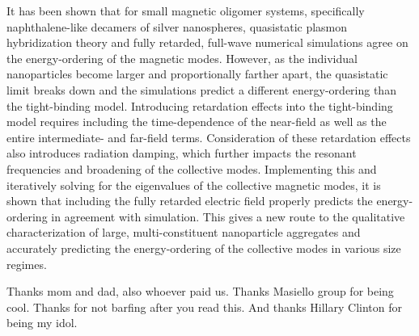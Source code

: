 \documentclass[journal=jpccck,manuscript=article]{achemso}
\begin{document}
It has been shown that for small magnetic oligomer systems, specifically naphthalene-like decamers of silver nanospheres, quasistatic plasmon hybridization theory and fully retarded, full-wave numerical simulations agree on the energy-ordering of the magnetic modes. However, as the individual nanoparticles become larger and proportionally farther apart, the quasistatic limit breaks down and the simulations predict a different energy-ordering than the tight-binding model. Introducing retardation effects into the tight-binding model requires including the time-dependence of the near-field as well as the entire intermediate- and far-field terms. Consideration of these retardation effects also introduces radiation damping, which further impacts the resonant frequencies and broadening of the collective modes. Implementing this and iteratively solving for the eigenvalues of the collective magnetic modes, it is shown that including the fully retarded electric field properly predicts the energy-ordering in agreement with simulation. This gives a new route to the qualitative characterization of large, multi-constituent nanoparticle aggregates and accurately predicting the energy-ordering of the collective modes in various size regimes.

\begin{acknowledgement}
Thanks mom and dad, also whoever paid us. Thanks Masiello group for being cool. Thanks for not barfing after you read this. And thanks Hillary Clinton for being my idol.
\end{acknowledgement}


\end{document}
